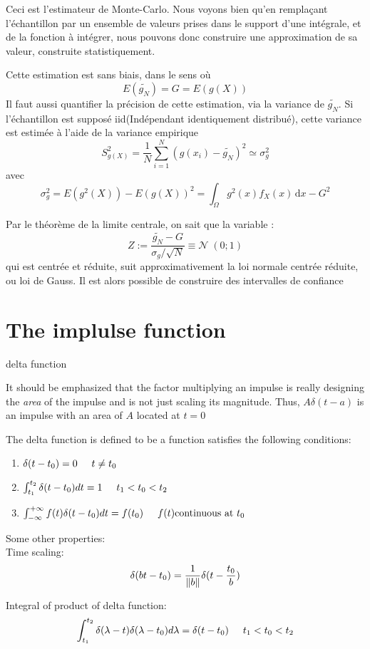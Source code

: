 \documentclass{article}
\begin{document}
Ceci est l'estimateur de Monte-Carlo. Nous voyons bien qu'en rempla\c{c}ant l'\'echantillon par un ensemble de valeurs prises dans le support d'une int\'egrale, et de la fonction \`a int\'egrer, nous pouvons donc construire une approximation de sa valeur, construite statistiquement.

Cette estimation est sans biais, dans le sens o\`u
$$ E(\tilde{g_N})= G = E(g(X)) $$
Il faut aussi quantifier la pr\'ecision de cette estimation, via la variance de $\tilde{g_N}$. Si l'\'echantillon est suppos\'e iid(Ind\'ependant identiquement distribu\'e), cette variance est estim\'ee \`a l'aide de la variance empirique
$$ S^2_{g(X)} = \frac{1}{N} \sum_{i=1}^N (g(x_i) - \tilde{g_N})^2 \simeq \sigma_g^2 $$
avec
$$ \sigma_g^2= E(g^2(X)) - E(g(X))^2 = \int_{\Omega} g^2(x) f_X(x) \,\mbox{d} x - G^2 $$

Par le th\'eor\`eme de la limite centrale, on sait que la variable :
$$ Z := \frac{\tilde{g_N}-G}{\sigma_g / \sqrt{N}} \equiv \mathcal{N} \; \left(0;1\right) $$
qui est centr\'ee et r\'eduite, suit approximativement la loi normale centr\'ee r\'eduite, ou loi de Gauss. Il est alors possible de construire des intervalles de confiance

\section{The implulse function}
delta function

It should be emphasized that the factor multiplying an impulse is really designing the \textit{area} of the impulse and is not just scaling its magnitude.
Thus, $A\delta(t-a)$ is an impulse with an area of $A$ located at $t=0$

The delta function is defined to be a function satisfies the following conditions:
\begin{enumerate}
\item $\delta(t - t_0) = 0 \hspace{0.5cm} t \neq t_0$
\item $\int_{t_1}^{t_2} \delta(t - t_0)dt =1 \hspace{0.5cm} t_1 < t_0 < t_2$
\item $\int_{- \infty}^{+ \infty} f(t) \delta(t - t_0)dt = f(t_0) \hspace{0.5cm} f(t) \text{continuous at }t_0$
\end{enumerate}

\bigskip
Some other properties:\\
Time scaling:
$$ \delta(bt - t_0) = \frac{1}{\left\Vert b\right\Vert} \delta(t - \frac{t_0}{b}) $$

Integral of product of delta function:
$$ \int_{t_1}^{t_2} \delta(\lambda - t) \delta(\lambda - t_0)d \lambda = \delta(t - t_0) \hspace{0.5cm} t_1 < t_0 < t_2 $$
\end{document}
